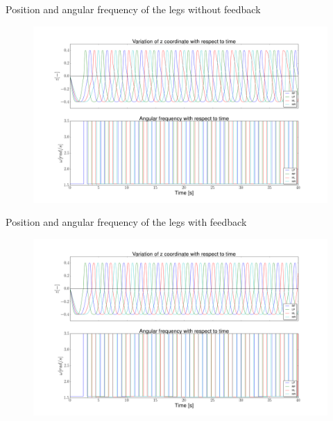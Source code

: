 \documentclass{beamer}
\begin{document}
\begin{frame}{Position and angular frequency of the legs without feedback}
\begin{center}
	\begin{figure}[ht]\centering
		\includegraphics[width=1.1\textwidth]{images/HeightTimeFF.png}
	\end{figure}\vspace{-20pt}
\end{center}
\end{frame}

\begin{frame}{Position and angular frequency of the legs with feedback}
\begin{center}
	\begin{figure}[ht]\centering
		\includegraphics[width=1.1\textwidth]{images/HeightTime.png}
	\end{figure}\vspace{-20pt}
\end{center}
\end{frame}
\end{document}
